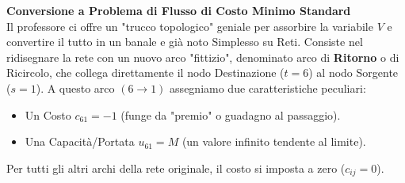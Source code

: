 \documentclass[12pt, a4paper]{article}
\newcommand{\separatore}{\noindent{\color{titlecolor!50}\rule{\textwidth}{0.6pt}}}
\begin{document}
	\vspace{0.6cm}
	\separatore
	\vspace{0.4cm}
	
	\textbf{Conversione a Problema di Flusso di Costo Minimo Standard}\\
	Il professore ci offre un "trucco topologico" geniale per assorbire la variabile $V$ e convertire il tutto in un banale e già noto Simplesso su Reti. Consiste nel ridisegnare la rete con un nuovo arco "fittizio", denominato arco di \textbf{Ritorno} o di Ricircolo, che collega direttamente il nodo Destinazione ($t=6$) al nodo Sorgente ($s=1$). 
	A questo arco $(6\to1)$ assegniamo due caratteristiche peculiari:
	\begin{itemize}
		\item Un Costo $c_{61} = -1$ (funge da "premio" o guadagno al passaggio).
		\item Una Capacità/Portata $u_{61} = M$ (un valore infinito tendente al limite).
	\end{itemize}
	Per tutti gli altri archi della rete originale, il costo si imposta a zero ($c_{ij} = 0$).
	
\end{document}
